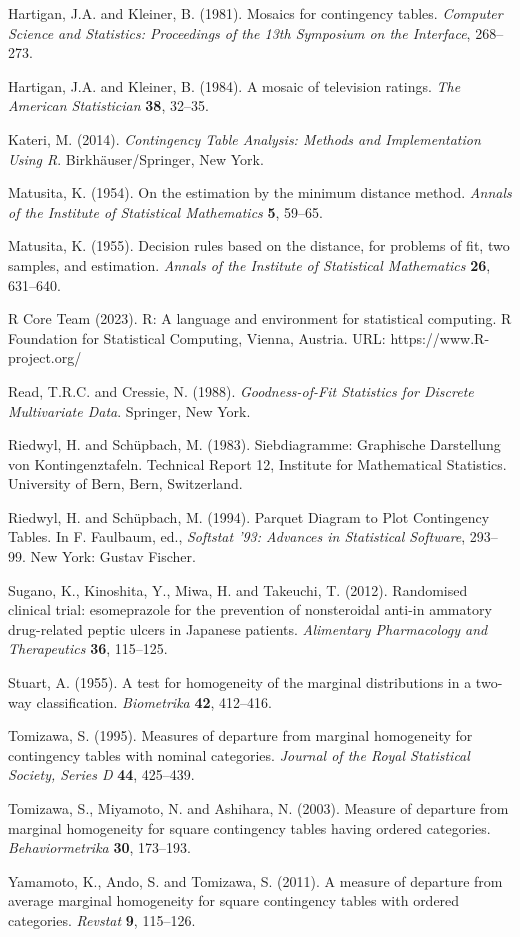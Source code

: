 \documentclass[a4j,12pt]{article}
\begin{document}
\begin{thebibliography}{99}
\item[]	Hartigan, J.A. and Kleiner, B. (1981). Mosaics for contingency tables. \textit{Computer Science and Statistics: Proceedings of the 13th Symposium on the Interface}, 268--273.
\item[]	Hartigan, J.A. and Kleiner, B. (1984). A mosaic of television ratings. \textit{The American Statistician} \textbf{38}, 32--35.
\item[]	Kateri, M. (2014). \textit{Contingency Table Analysis: Methods and Implementation Using R}. Birkh\"auser/Springer, New York.
\item[]	Matusita, K. (1954). On the estimation by the minimum distance method. \textit{Annals of the Institute of Statistical Mathematics} \textbf{5}, 59--65.
\item[]	Matusita, K. (1955). Decision rules based on the distance, for problems of fit, two samples, and estimation. \textit{Annals of the Institute of Statistical Mathematics} \textbf{26}, 631--640.
\item[]	R Core Team (2023). R: A language and environment for statistical computing. R Foundation for Statistical Computing, Vienna, Austria. URL: https://www.R-project.org/
\item[]	Read, T.R.C. and Cressie, N. (1988). \textit{Goodness-of-Fit Statistics for Discrete Multivariate Data}. Springer, New York.
\item[]	Riedwyl, H. and Sch\"{u}pbach, M. (1983). Siebdiagramme: Graphische Darstellung von Kontingenztafeln. Technical Report 12, Institute for Mathematical Statistics. University of Bern, Bern, Switzerland.
\item[]	Riedwyl, H. and Sch\"{u}pbach, M. (1994). Parquet Diagram to Plot Contingency Tables. In F. Faulbaum, ed., \textit{Softstat ’93: Advances in Statistical Software}, 293--99. New York: Gustav Fischer.
\item[]	Sugano, K., Kinoshita, Y., Miwa, H. and Takeuchi, T. (2012). Randomised clinical trial: esomeprazole for the prevention of nonsteroidal anti-in ammatory drug-related peptic ulcers in Japanese patients. \textit{Alimentary Pharmacology and Therapeutics} \textbf{36}, 115--125.
\item[]	Stuart, A. (1955). A test for homogeneity of the marginal distributions in a two-way classification. \textit{Biometrika} \textbf{42}, 412--416.
\item[]	Tomizawa, S. (1995). Measures of departure from marginal homogeneity for contingency tables with nominal categories. \textit{Journal of the Royal Statistical Society, Series D} \textbf{44}, 425--439.
\item[]	Tomizawa, S., Miyamoto, N. and Ashihara, N. (2003). Measure of departure from marginal homogeneity for square contingency tables having ordered categories. \textit{Behaviormetrika} \textbf{30}, 173--193.
\item[]	Yamamoto, K., Ando, S. and Tomizawa, S. (2011). A measure of departure from average marginal homogeneity for square contingency tables with ordered categories. \textit{Revstat} \textbf{9}, 115--126.
\end{thebibliography}
\end{document}
